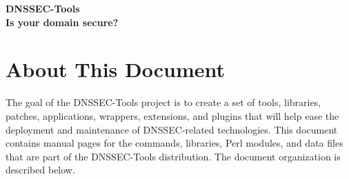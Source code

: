 \documentclass[12pt]{article}
\begin{document}
\clearpage

\begin{center}
{\Large
{\bf DNSSEC-Tools\\
Is your domain secure?}}
\end{center}
\tableofcontents
{}


\clearpage

\section{About This Document}
\label{sect-about}

The goal of the DNSSEC-Tools project is to create a set of tools, libraries,
patches, applications, wrappers, extensions, and plugins that will help ease
the deployment and maintenance of DNSSEC-related technologies. This document contains manual
pages for the commands, libraries, Perl modules, and data files that are part
of the DNSSEC-Tools distribution.  The document organization is described
below.
\end{document}
